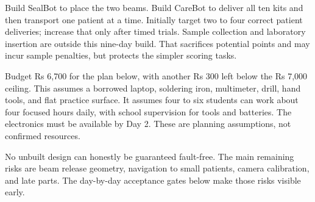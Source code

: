\documentclass[10pt,a4paper]{article}
\begin{document}
Build SealBot to place the two beams. Build CareBot to deliver all ten kits and then transport one patient at a time. Initially target two to four correct patient deliveries; increase that only after timed trials. Sample collection and laboratory insertion are outside this nine-day build. That sacrifices potential points and may incur sample penalties, but protects the simpler scoring tasks.

Budget Rs 6,700 for the plan below, with another Rs 300 left below the Rs 7,000 ceiling. This assumes a borrowed laptop, soldering iron, multimeter, drill, hand tools, and flat practice surface. It assumes four to six students can work about four focused hours daily, with school supervision for tools and batteries. The electronics must be available by Day 2. These are planning assumptions, not confirmed resources.

No unbuilt design can honestly be guaranteed fault-free. The main remaining risks are beam release geometry, navigation to small patients, camera calibration, and late parts. The day-by-day acceptance gates below make those risks visible early.
\end{document}
